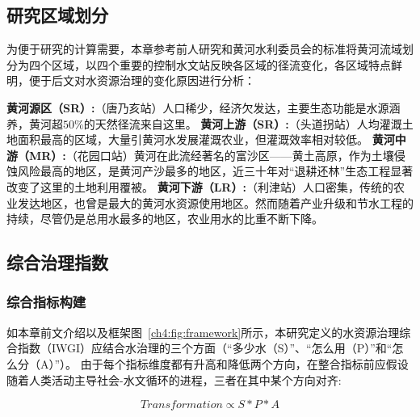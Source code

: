 \subsection{研究区域划分}\label{ch4:sec:region}

为便于研究的计算需要，本章参考前人研究和黄河水利委员会的标准将黄河流域划分为四个区域\cite{shuilibuhuangheshuiliweiyuanhui,wang2019c,wang2016e}，以四个重要的控制水文站反映各区域的径流变化，各区域特点鲜明，便于后文对水资源治理的变化原因进行分析：

\textbf{黄河源区（SR）:}（唐乃亥站）人口稀少，经济欠发达，主要生态功能是水源涵养，黄河超$50\%$的天然径流来自这里。
\textbf{黄河上游（SR）:}（头道拐站）人均灌溉土地面积最高的区域，大量引黄河水发展灌溉农业，但灌溉效率相对较低。
\textbf{黄河中游（MR）:}（花园口站）黄河在此流经著名的富沙区——黄土高原，作为土壤侵蚀风险最高的地区，是黄河产沙最多的地区，近三十年对“退耕还林”生态工程显著改变了这里的土地利用覆被。
\textbf{黄河下游（LR）:}（利津站）人口密集，传统的农业发达地区，也曾是最大的黄河水资源使用地区。然而随着产业升级和节水工程的持续，尽管仍是总用水最多的地区，农业用水的比重不断下降。



\subsection{综合治理指数}

\subsubsection{综合指标构建}

如本章前文介绍以及框架图~\ref{ch4:fig:framework}所示，本研究定义的水资源治理综合指数（IWGI）应结合水治理的三个方面（“多少水（S）”、“怎么用（P）”和“怎么分（A）”）。
由于每个指标维度都有升高和降低两个方向，在整合指标前应假设随着人类活动主导社会-水文循环的进程，三者在其中某个方向对齐:

\begin{equation}
    Transformation \propto S*P*A
\end{equation}


